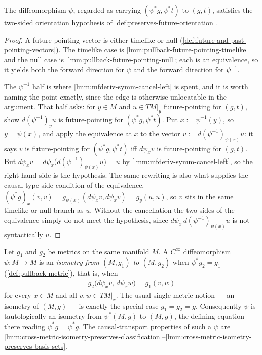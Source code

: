 \begin{lemma}
    \label{lmm:pullback-preserves-future-orientation}
    The diffeomorphism $\psi$, regarded as carrying $(\psi^*g, \psi^*t)$ to $(g,t)$, satisfies the two-sided orientation hypothesis of \ref{def:preserves-future-orientation}.
\end{lemma}
\begin{proof}
    A future-pointing vector is either timelike or null (\ref{def:future-and-past-pointing-vectors}). The timelike case is \ref{lmm:pullback-future-pointing-timelike} and the null case is \ref{lmm:pullback-future-pointing-null}; each is an equivalence, so it yields both the forward direction for $\psi$ and the forward direction for $\psi^{-1}$.

    The $\psi^{-1}$ half is where \ref{lmm:mfderiv-symm-cancel-left} is spent, and it is worth naming the point exactly, since the edge is otherwise unlocatable in the argument. That half asks: for $y \in M$ and $u \in TM|_y$ future-pointing for $(g,t)$, show $d(\psi^{-1})_y u$ is future-pointing for $(\psi^*g, \psi^*t)$. Put $x := \psi^{-1}(y)$, so $y = \psi(x)$, and apply the equivalence at $x$ to the vector $v := d(\psi^{-1})_{\psi(x)}u$: it says $v$ is future-pointing for $(\psi^*g,\psi^*t)$ iff $d\psi_x v$ is future-pointing for $(g,t)$. But $d\psi_x v = d\psi_x\big(d(\psi^{-1})_{\psi(x)}u\big) = u$ by \ref{lmm:mfderiv-symm-cancel-left}, so the right-hand side is the hypothesis. The same rewriting is also what supplies the causal-type side condition of the equivalence, $(\psi^*g)_x(v,v) = g_{\psi(x)}(d\psi_x v, d\psi_x v) = g_y(u,u)$, so $v$ sits in the same timelike-or-null branch as $u$. Without the cancellation the two sides of the equivalence simply do not meet the hypothesis, since $d\psi_x\,d(\psi^{-1})_{\psi(x)}u$ is not syntactically $u$.
\end{proof}

\begin{definition}
    \label{def:cross-metric-isometry}
    Let $g_1$ and $g_2$ be metrics on the same manifold $M$. A $C^\infty$ diffeomorphism $\psi : M \to M$ is an \emph{isometry from $(M,g_1)$ to $(M,g_2)$} when $\psi^*g_2 = g_1$ (\ref{def:pullback-metric}), that is, when
    \begin{align}
        g_2\big(d\psi_x v,\, d\psi_x w\big) = g_1(v,w)
    \end{align}
    for every $x \in M$ and all $v, w \in TM|_x$. The usual single-metric notion --- an isometry of $(M,g)$ --- is exactly the special case $g_1 = g_2 = g$. Consequently $\psi$ is tautologically an isometry from $\psi^*(M,g)$ to $(M,g)$, the defining equation there reading $\psi^*g = \psi^*g$. The causal-transport properties of such a $\psi$ are \ref{lmm:cross-metric-isometry-preserves-classification}--\ref{lmm:cross-metric-isometry-preserves-basis-sets}.
\end{definition}

